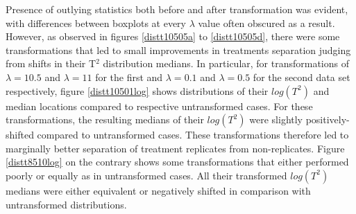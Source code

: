 \documentclass[11pt]{article}
\begin{document}
\par{Presence of outlying statistics both before and after transformation was evident, with differences between boxplots at every $\lambda$ value often obscured as a result. However, as observed in figures \ref{distt10505a} to \ref{distt10505d}, there were some transformations that led to small improvements in treatments separation judging from shifts in their T$^2$ distribution medians. In particular, for transformations of $\lambda =10.5$ and $\lambda =11$ for the first and $\lambda = 0.1$ and $\lambda = 0.5$ for the second data set respectively, figure \ref{distt10501log} shows distributions of their $log(T^2)$ and median locations compared to respective untransformed cases. For these transformations, the resulting medians of their $log(T^2)$ were slightly positively-shifted compared to untransformed cases. These transformations therefore led to marginally better separation of treatment replicates from non-replicates. Figure \ref{distt8510log} on the contrary shows some transformations that either performed poorly or equally as in untransformed cases. All their transformed $log(T^2)$ medians were either equivalent or negatively shifted in comparison with untransformed distributions.}
\end{document}
